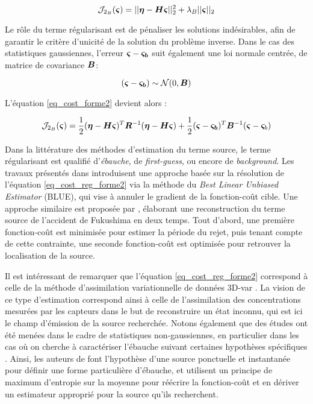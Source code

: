  \begin{equation}
 {
 \mathcal{J}_{2_B}({\bm{\varsigma}}) = ||{\bm{\eta}}- {\bm{H}}{\bm{\varsigma}}||_2^2 + \lambda_B ||{\bm{\varsigma}}||_2
 \label{eq_cost_MCO_reg}
}
 \end{equation}
 
 Le rôle du terme régularisant est de pénaliser les solutions indésirables, afin de garantir le critère d'unicité de la solution du problème inverse.  Dans le cas des statistiques gaussiennes, l'erreur  ${\bm{\varsigma}} - {\bm{\varsigma_b}}$ suit également une loi normale centrée, de matrice de covariance ${\bm{B}}$:
  
  \begin{equation}
  ({\bm{\varsigma}} - {\bm{\varsigma_b}}) \sim \mathcal{N}(0,{\bm{B}})
  \label{eq_erreur_ebauche}
  \end{equation}
  
  L'équation \eqref{eq_cost_forme2} devient alors \cite{Winiarek2011}: 
 
\begin{equation}
\mathcal{J}_{2_B}({\bm{\varsigma}}) = \dfrac{1}{2}({\bm{\eta}} - {\bm{H}} {\bm{\varsigma}})^T {\bm{R}}^{-1}({\bm{\eta}} - {\bm{H}}{\bm{\varsigma}}) + \dfrac{1}{2}({\bm{\varsigma}} - {\bm{\varsigma_b}})^T{\bm{B}}^{-1}({\bm{\varsigma}} - {{\bm{\varsigma}}_b})
\label{eq_cost_reg_forme2}
\end{equation}

Dans la littérature des méthodes d'estimation du terme source, le terme régularisant est qualifié d'\textit{ébauche}, de \textit{first-guess}, ou encore de \textit{background}. Les travaux présentés dans \cite{Winiarek2012} introduisent une approche basée sur la résolution de l'équation \eqref{eq_cost_reg_forme2} via la méthode du \textit{Best Linear Unbiased Estimator} (BLUE), qui vise à annuler le gradient de la fonction-coût cible. Une approche similaire est proposée par \cite{Saunier2013}, élaborant une reconstruction du terme source de l'accident de Fukushima en deux temps. Tout d'abord, une première fonction-coût est minimisée pour estimer la période du rejet, puis tenant compte de cette contrainte, une seconde fonction-coût est optimisée pour retrouver la localisation de la source. 

Il est intéressant de remarquer que l'équation \eqref{eq_cost_reg_forme2} correspond à celle de la méthode d'assimilation variationnelle de données 3D-var \cite{Courtier1998}. La vision de ce type d'estimation correspond  ainsi à celle de l'assimilation des concentrations mesurées par les capteurs dans le but de reconstruire un état inconnu, qui est ici le champ d'émission de la source recherchée. Notons également que des études ont été menées dans le cadre de statistiques non-gaussiennes, en particulier dans les cas où on cherche à caractériser l'ébauche suivant certaines hypothèses spécifiques \cite{Bocquet2005a}. Ainsi, les auteurs de \cite{Krysta2007} font l'hypothèse d'une source ponctuelle et instantanée pour définir une forme particulière d'ébauche, et utilisent un principe de maximum d'entropie sur la moyenne \cite{Jaynes1957} pour réécrire la fonction-coût et en dériver un estimateur approprié pour la source qu'ils recherchent.\\

